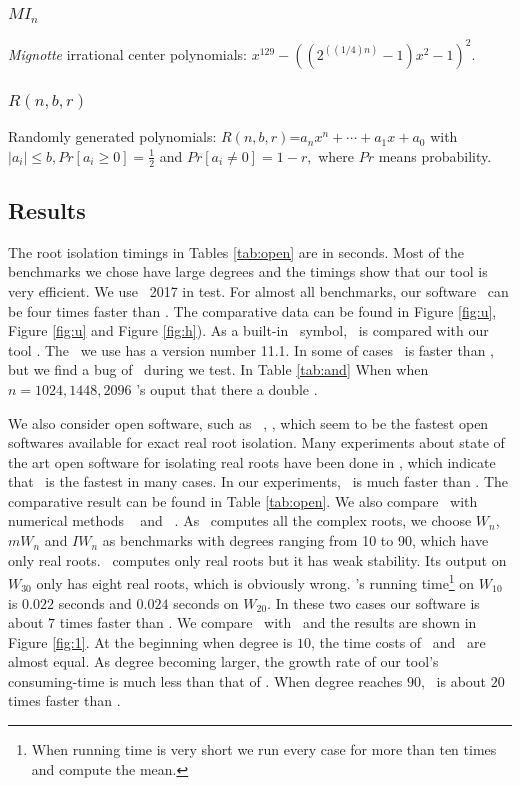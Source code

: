  \subsubsection{$MI_n$} {\it Mignotte} irrational center polynomials: $x^{129}-((2^((1/4)n)-1)x^2-1)^2$.
 
 
 \subsubsection{$R(n,b,r) $} Randomly generated polynomials: $R(n,b,r)$=$a_nx^n+\cdots+a_1x+a_0$ with $|a_i|\le b, Pr[a_i\ge 0]=\frac{1}{2}$ and  $Pr[a_i\neq 0] =1-r,$ where $Pr$ means probability.
 \subsection{Results}
 The root isolation timings in Tables \ref{tab:open} are in seconds.  Most of the benchmarks we chose have large degrees and the timings show that our tool is very efficient.
 {\color{red} We use   \MAPLE\ 2017 in test.}  For  almost all
 benchmarks, our  software \froot\  can be  four  times faster than \REALROOT. The comparative data can be found in Figure \ref{fig:u}, Figure \ref{fig:u} and Figure \ref{fig:h}). As a  built-in \MM\ symbol, \inte\ is    compared with  our tool \froot. The  \MM\  we use has a version number 11.1. {\color{red} In some of cases \inte\ is faster than \froot, but we find a bug of  \MM\  during we test. In Table  \ref{tab:and} When when $n=1024,1448,2096$  \inte's ouput that there a double .}
 
 
 We also consider open software,  such as \cf\  \cite{hemmer09}, \AND\cite{Tsigaridas2016}, which
 seem to be the fastest  open softwares  available for exact real root isolation. Many experiments  about  state of the art open software for isolating
 real roots have been done in \cite{hemmer09},  which  indicate that     \cf\  is the fastest in many cases.
 In our experiments, \froot\ is much faster than \cf. %
 The comparative result can be found in
 Table \ref{tab:open}. We also compare \froot\  with numerical methods  \eign\ \cite{eigsolev} and \sle\ \cite{hemmer09}. As \eign\ computes all the complex roots, we choose $W_n$, $mW_n$ and $IW_n$ as benchmarks with degrees ranging from 10 to 90, which have only real roots. \sle\ computes only real roots but it has weak stability. Its output on $W_{30}$ only has eight real roots, which is obviously wrong. \sle's running time\footnote{When  running time is very short we run every case for more than ten times and compute the mean.} on $W_{10}$ is $0.022$ seconds and
 $0.024$ seconds on $W_{20}$. In these two cases our software is about $7$ times faster than \sle. We compare \froot\ with  \eign\ and the results are  shown in Figure \ref{fig:1}.
 At the beginning when degree is $10$, the time costs of \froot\ and \eign\ are
 almost equal. As degree becoming larger, the growth rate of our tool's consuming-time is much less than that of  \eign.  When degree reaches $90$, \froot\ is about $20$ times faster than \eign.


